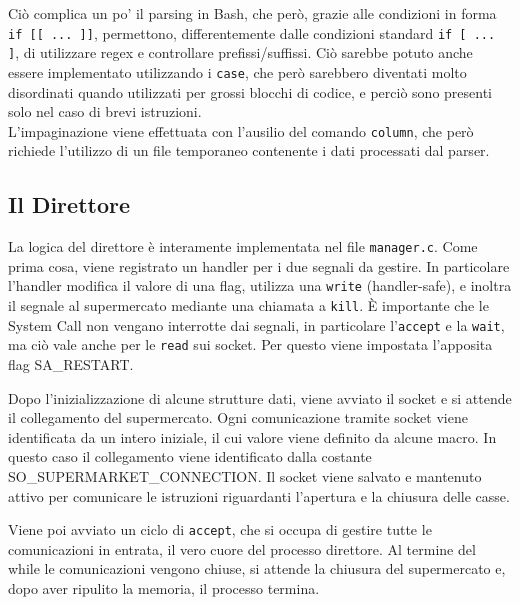 \documentclass[a4paper,11pt] {article}
\begin{document}


Ciò complica un po' il parsing in Bash, che però, grazie alle condizioni in forma \lstinline{if [[ ... ]]}, permettono, differentemente dalle condizioni standard \lstinline{if [ ... ]}, di utilizzare regex e controllare prefissi/suffissi. Ciò sarebbe potuto anche essere implementato utilizzando i \lstinline{case}, che però sarebbero diventati molto disordinati quando utilizzati per grossi blocchi di codice, e perciò sono presenti solo nel caso di brevi istruzioni.\\
L'impaginazione viene effettuata con l'ausilio del comando \lstinline{column}, che però richiede l'utilizzo di un file temporaneo contenente i dati processati dal parser.

\subsection*{Il Direttore}

La logica del direttore è interamente implementata nel file \lstinline{manager.c}. Come prima cosa, viene registrato un handler per i due segnali da gestire. In particolare l'handler modifica il valore di una flag, utilizza una \lstinline{write} (handler-safe), e inoltra il segnale al supermercato mediante una chiamata a \lstinline{kill}. È importante che le System Call non vengano interrotte dai segnali, in particolare l'\lstinline{accept} e la \lstinline{wait}, ma ciò vale anche per le \lstinline{read} sui socket. Per questo viene impostata l'apposita flag SA\_RESTART.

Dopo l'inizializzazione di alcune strutture dati, viene avviato il socket e si attende il collegamento del supermercato. Ogni comunicazione tramite socket viene identificata da un intero iniziale, il cui valore viene definito da alcune macro. In questo caso il collegamento viene identificato dalla costante SO\_SUPERMARKET\_CONNECTION. Il socket viene salvato e mantenuto attivo per comunicare le istruzioni riguardanti l'apertura e la chiusura delle casse.

Viene poi avviato un ciclo di \lstinline{accept}, che si occupa di gestire tutte le comunicazioni in entrata, il vero cuore del processo direttore. Al termine del while le comunicazioni vengono chiuse, si attende la chiusura del supermercato e, dopo aver ripulito la memoria, il processo termina.
\end{document}
